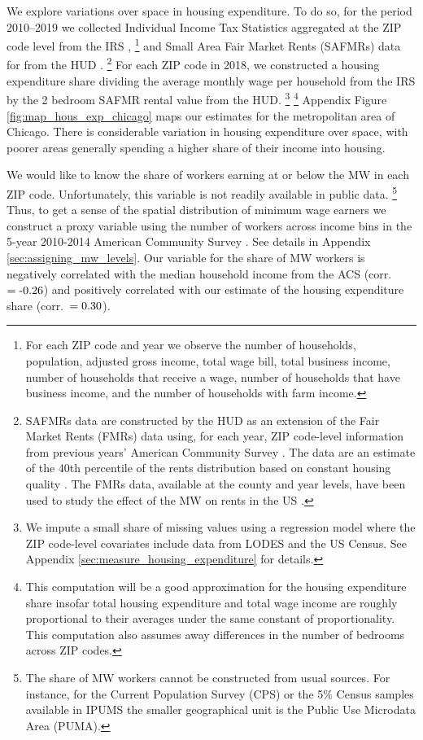 We explore variations over space in housing expenditure.
To do so, for the period 2010--2019
we collected Individual Income Tax Statistics aggregated at the ZIP code level 
from the IRS \parencite{IRS},%
\footnote{For each ZIP code and year we observe the number of households, 
population, adjusted gross income, total wage bill, total business income, 
number of households that receive a wage, number of households that have 
business income, and the number of households with farm income.}
and Small Area Fair Market Rents (SAFMRs) data for from the HUD 
\parencite{hudSAFMR}.%
\footnote{SAFMRs data are constructed by the HUD as an extension of the
Fair Market Rents (FMRs) data using, for each year, ZIP code-level information
from previous years' American Community Survey 
\parencite[][, p.\ 35]{SafmrReport2018}.
The data are an estimate of the 40th percentile of the rents distribution
based on constant housing quality \parencite[][, p.\ 1]{SafmrReport2018}.
The FMRs data, available at the county and year levels, have been used to study 
the effect of the MW on rents in the US \parencite{Tidemann2018, Yamagishi2019}.}
For each ZIP code in 2018, we constructed a housing expenditure share dividing 
the average monthly wage per household from the IRS by the 2 bedroom SAFMR 
rental value from the HUD.%
\footnote{We impute a small share of missing values using a regression model 
where the ZIP code-level covariates include data from LODES and the US Census.
See Appendix \ref{sec:measure_housing_expenditure} for details.}%
\footnote{This computation will be a good approximation for the housing 
expenditure share insofar total housing expenditure and total wage income are 
roughly proportional to their averages under the same constant of 
proportionality.
This computation also assumes away differences in the number of bedrooms across 
ZIP codes.}
Appendix Figure \ref{fig:map_hous_exp_chicago} maps our estimates for the 
metropolitan area of Chicago.
There is considerable variation in housing expenditure over space, with poorer
areas generally spending a higher share of their income into housing.

We would like to know the share of workers earning at or below the MW in each 
ZIP code.
Unfortunately, this variable is not readily available in public data.%
\footnote{The share of MW workers cannot be constructed from usual sources.
For instance, for the Current Population Survey (CPS) or the 5\% Census 
samples available in IPUMS the smaller geographical unit is the Public Use 
Microdata Area (PUMA).}
Thus, to get a sense of the spatial distribution of minimum wage earners we 
construct a proxy variable using the number of workers across income bins
in the 5-year 2010-2014 American Community Survey \parencite[ACS;][]{CensusACS}.
See details in Appendix \ref{sec:assigning_mw_levels}.
Our variable for the share of MW workers is negatively correlated with the
median household income from the ACS (corr.\ $=\textnormal{-0.26}$) and 
positively correlated with our estimate of the housing expenditure share 
(corr.\ $=\textnormal{0.30}$).

